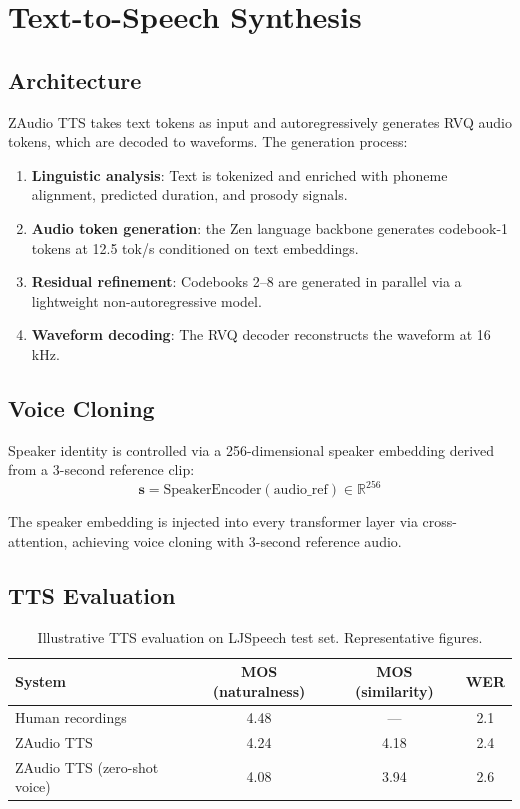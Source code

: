 \documentclass[11pt,a4paper]{article}
\begin{document}
\section{Text-to-Speech Synthesis}

\subsection{Architecture}

ZAudio TTS takes text tokens as input and autoregressively generates RVQ audio tokens, which are decoded to waveforms. The generation process:

\begin{enumerate}
  \item \textbf{Linguistic analysis}: Text is tokenized and enriched with phoneme alignment, predicted duration, and prosody signals.
  \item \textbf{Audio token generation}: the Zen language backbone generates codebook-1 tokens at 12.5 tok/s conditioned on text embeddings.
  \item \textbf{Residual refinement}: Codebooks 2--8 are generated in parallel via a lightweight non-autoregressive model.
  \item \textbf{Waveform decoding}: The RVQ decoder reconstructs the waveform at 16 kHz.
\end{enumerate}

\subsection{Voice Cloning}

Speaker identity is controlled via a 256-dimensional speaker embedding derived from a 3-second reference clip:
\begin{equation}
\mathbf{s} = \text{SpeakerEncoder}(\text{audio\_ref}) \in \mathbb{R}^{256}
\end{equation}

The speaker embedding is injected into every transformer layer via cross-attention, achieving voice cloning with 3-second reference audio.

\subsection{TTS Evaluation}

\begin{table}[H]
\centering
\caption{Illustrative TTS evaluation on LJSpeech test set. Representative figures.}
\label{tab:tts}
\begin{tabular}{lccc}
\toprule
System & MOS (naturalness) & MOS (similarity) & WER \\
\midrule
Human recordings & 4.48 & — & 2.1 \\
ZAudio TTS & 4.24 & 4.18 & 2.4 \\
ZAudio TTS (zero-shot voice) & 4.08 & 3.94 & 2.6 \\
\bottomrule
\end{tabular}
\end{table}
\end{document}
